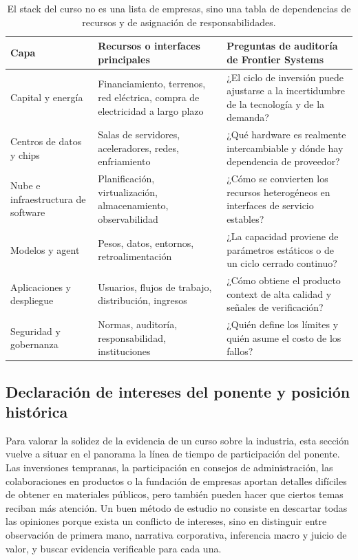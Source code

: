 \begin{table}[H]
\centering
\begin{tabular}{L{0.18\textwidth}L{0.34\textwidth}L{0.38\textwidth}}
\toprule
Capa & Recursos o interfaces principales & Preguntas de auditoría de Frontier Systems \\
\midrule
Capital y energía & Financiamiento, terrenos, red eléctrica, compra de electricidad a largo plazo & ¿El ciclo de inversión puede ajustarse a la incertidumbre de la tecnología y de la demanda? \\
Centros de datos y chips & Salas de servidores, aceleradores, redes, enfriamiento & ¿Qué hardware es realmente intercambiable y dónde hay dependencia de proveedor? \\
Nube e infraestructura de software & Planificación, virtualización, almacenamiento, observabilidad & ¿Cómo se convierten los recursos heterogéneos en interfaces de servicio estables? \\
Modelos y agent & Pesos, datos, entornos, retroalimentación & ¿La capacidad proviene de parámetros estáticos o de un ciclo cerrado continuo? \\
Aplicaciones y despliegue & Usuarios, flujos de trabajo, distribución, ingresos & ¿Cómo obtiene el producto context de alta calidad y señales de verificación? \\
Seguridad y gobernanza & Normas, auditoría, responsabilidad, instituciones & ¿Quién define los límites y quién asume el costo de los fallos? \\
\bottomrule
\end{tabular}
\caption{El stack del curso no es una lista de empresas, sino una tabla de dependencias de recursos y de asignación de responsabilidades.}
\end{table}

\subsection{Declaración de intereses del ponente y posición histórica}

Para valorar la solidez de la evidencia de un curso sobre la industria, esta sección vuelve a situar en el panorama la línea de tiempo de participación del ponente. Las inversiones tempranas, la participación en consejos de administración, las colaboraciones en productos o la fundación de empresas aportan detalles difíciles de obtener en materiales públicos, pero también pueden hacer que ciertos temas reciban más atención. Un buen método de estudio no consiste en descartar todas las opiniones porque exista un conflicto de intereses, sino en distinguir entre observación de primera mano, narrativa corporativa, inferencia macro y juicio de valor, y buscar evidencia verificable para cada una.

